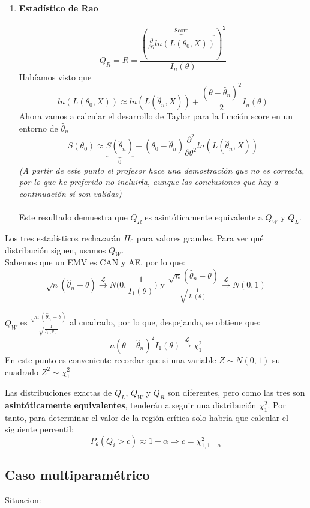 \begin{enumerate}
    \item \textbf{Estadístico de Rao}\\\ \\
    $$Q_R=R=\frac{\left(\overbrace{\frac{\partial}{\partial\theta}ln(L(\theta_0,X))}^{\text{Score}}\right)^2}{I_n(\theta)}$$
    Habíamos visto que 
    $$ln(L(\theta_0,X))\approx ln(L(\hat\theta_n,X))+\frac{(\theta-\hat\theta_n)^2}{2}I_n(\theta)$$
    Ahora vamos a calcular el desarrollo de Taylor para la función score en un entorno de $\hat\theta_n$
    $$S(\theta_0)\approx \underbrace{S(\hat\theta_n)}_{0}+(\theta_0-\hat\theta_n)\frac{\partial^2}{\partial\theta^2}ln(L(\hat\theta_n,X))$$
    \textit{(A partir de este punto el profesor hace una demostración que no es correcta, por lo que he preferido no incluirla, aunque las conclusiones que hay a continuación sí son validas)}\\\ \\
    Este resultado demuestra que $Q_R$ es asintóticamente equivalente a $Q_W$ y $Q_L$. 
\end{enumerate}

Los tres estadísticos rechazarán $H_0$ para valores grandes. Para ver qué distribución siguen, usamos $Q_W$.\\
Sabemos que un EMV es CAN y AE, por lo que:
$$\sqrt{n}(\hat\theta_n-\theta)\overset{\mathcal{L}}{\longrightarrow}N\Big(0,\frac{1}{I_1(\theta)}\Big)\text{ y }\frac{\sqrt{n}(\hat\theta_n-\theta)}{\sqrt{\frac{1}{I_1(\theta)}}}\overset{\mathcal{L}}{\longrightarrow}N(0,1)$$

$Q_W$ es $\displaystyle\frac{\sqrt{n}(\hat\theta_n-\theta)}{\sqrt{\frac{1}{I_1(\theta)}}}$ al cuadrado, por lo que, despejando, se obtiene que:
$$n(\theta-\hat\theta_n)^2I_1(\theta)\overset{\mathcal{L}}{\longrightarrow}\chi^2_1$$
En este punto es conveniente recordar que si una variable $Z\sim N(0,1)$ su cuadrado $Z^2\sim \chi^2_1$

Las distribuciones exactas de $Q_L$, $Q_W$ y $Q_R$ son diferentes, pero como las tres son \textbf{asintóticamente equivalentes}, tenderán a seguir una distribución $\chi^2_1$. 
Por tanto, para determinar el valor de la región crítica solo habría que calcular el siguiente percentil:
$$P_{\theta}(Q_i>c)\approx 1-\alpha\Longrightarrow  c=\chi^2_{1,1-\alpha}$$

\subsection{Caso multiparamétrico}

Situacion:

